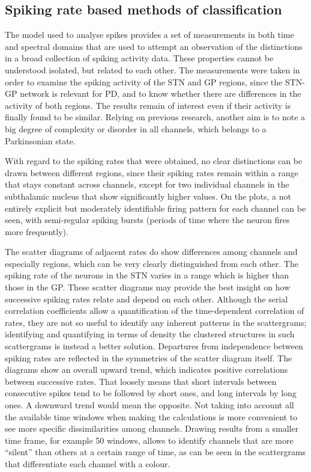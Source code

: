 \documentclass{article}
\begin{document}
\subsection{Spiking rate based methods of classification}

The model used to analyse spikes provides a set of measurements in both time and spectral domains that are used to attempt an observation of the distinctions in a broad collection of spiking activity data. These properties cannot be understood isolated, but related to each other. The measurements were taken in order to examine the spiking activity of the STN and GP regions, since the STN-GP network is relevant for PD, and to know whether there are differences in the activity of both regions. The results remain of interest even if their activity is finally found to be similar. Relying on previous research, another aim is to note a big degree of complexity or disorder in all channels, which belongs to a Parkinsonian state.

With regard to the spiking rates that were obtained, no clear distinctions can be drawn between different regions, since their spiking rates remain within a range that stays constant across channels, except for two individual channels in the subthalamic nucleus that show significantly higher values. On the plots, a not entirely explicit but moderately identifiable firing pattern for each channel can be seen, with semi-regular spiking bursts (periods of time where the neuron fires more frequently). 

The scatter diagrams of adjacent rates do show differences among channels and especially regions, which can be very clearly distinguished from each other. The spiking rate of the neurons in the STN varies in a range which is higher than those in the GP. 
These scatter diagrams may provide the best insight on how successive spiking rates relate and depend on each other. Although the serial correlation coefficients allow a quantification of the time-dependent correlation of rates, they are not so useful to identify any inherent patterns in the scattergrams; identifying and quantifying in terms of density the clustered structures in such scattergrams is instead a better solution. 
Departures from independence between spiking rates are reflected in the symmetries of the scatter diagram itself. The diagrams show an overall upward trend, which indicates positive correlations between successive rates. That loosely means that short intervals between consecutive spikes tend to be followed by short ones, and long intervals by long ones. A downward trend would mean the opposite.
Not taking into account all the available time windows when making the calculations is more convenient to see more specific dissimilarities among channels. Drawing results from a smaller time frame, for example 50 windows, allows to identify channels that are more “silent” than others at a certain range of time, as can be seen in the scattergrams that differentiate each channel with a colour. 
\end{document}

